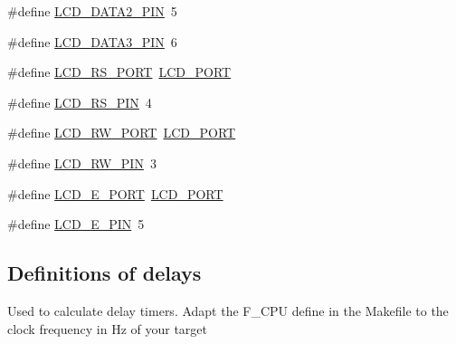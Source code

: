 \begin{DoxyCompactItemize}
\#define \mbox{\hyperlink{group__pfleury__lcd_ga7f3d53627337f6535cc8daa35876510a}{L\+C\+D\+\_\+\+D\+A\+T\+A2\+\_\+\+P\+IN}}~5
\item 
\#define \mbox{\hyperlink{group__pfleury__lcd_ga54032ce0050853e181f879b69fec4370}{L\+C\+D\+\_\+\+D\+A\+T\+A3\+\_\+\+P\+IN}}~6
\item 
\#define \mbox{\hyperlink{group__pfleury__lcd_gac5be2a22727fd9ca349e1c9bcbfbcd47}{L\+C\+D\+\_\+\+R\+S\+\_\+\+P\+O\+RT}}~\mbox{\hyperlink{group__pfleury__lcd_gabcf42bd88b3c36193f301ca25b033875}{L\+C\+D\+\_\+\+P\+O\+RT}}
\item 
\#define \mbox{\hyperlink{group__pfleury__lcd_gae5c0a0a5750f3aaea06083e3a4a31f5d}{L\+C\+D\+\_\+\+R\+S\+\_\+\+P\+IN}}~4
\item 
\#define \mbox{\hyperlink{group__pfleury__lcd_gae8772bdf31db863b81805c837bdc2da2}{L\+C\+D\+\_\+\+R\+W\+\_\+\+P\+O\+RT}}~\mbox{\hyperlink{group__pfleury__lcd_gabcf42bd88b3c36193f301ca25b033875}{L\+C\+D\+\_\+\+P\+O\+RT}}
\item 
\#define \mbox{\hyperlink{group__pfleury__lcd_ga3ac938dd5fc02a9a232df6605b5f6aa8}{L\+C\+D\+\_\+\+R\+W\+\_\+\+P\+IN}}~3
\item 
\#define \mbox{\hyperlink{group__pfleury__lcd_gaf97f97ff3832d1289bbcb471090ea297}{L\+C\+D\+\_\+\+E\+\_\+\+P\+O\+RT}}~\mbox{\hyperlink{group__pfleury__lcd_gabcf42bd88b3c36193f301ca25b033875}{L\+C\+D\+\_\+\+P\+O\+RT}}
\item 
\#define \mbox{\hyperlink{group__pfleury__lcd_gae644d776392a8d47899d9910c2b8feb6}{L\+C\+D\+\_\+\+E\+\_\+\+P\+IN}}~5
\end{DoxyCompactItemize}
\subsection*{Definitions of delays}
\label{_amgrp73324fc181df7d63636f86a5b76e74f2}%
Used to calculate delay timers. Adapt the F\+\_\+\+C\+PU define in the Makefile to the clock frequency in Hz of your target

